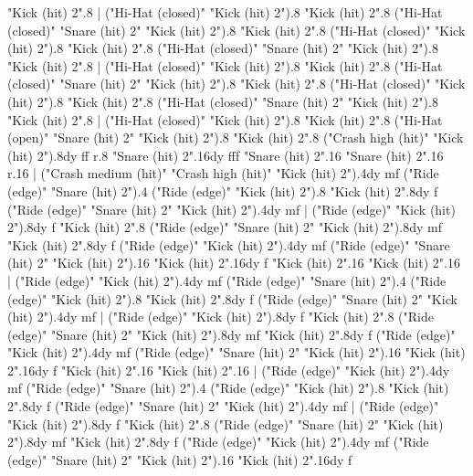       "Kick (hit) 2".8
    |
      ("Hi-Hat (closed)" "Kick (hit) 2").8
      "Kick (hit) 2".8
      ("Hi-Hat (closed)" "Snare (hit) 2" "Kick (hit) 2").8
      "Kick (hit) 2".8
      ("Hi-Hat (closed)" "Kick (hit) 2").8
      "Kick (hit) 2".8
      ("Hi-Hat (closed)" "Snare (hit) 2" "Kick (hit) 2").8
      "Kick (hit) 2".8
    |
      ("Hi-Hat (closed)" "Kick (hit) 2").8
      "Kick (hit) 2".8
      ("Hi-Hat (closed)" "Snare (hit) 2" "Kick (hit) 2").8
      "Kick (hit) 2".8
      ("Hi-Hat (closed)" "Kick (hit) 2").8
      "Kick (hit) 2".8
      ("Hi-Hat (closed)" "Snare (hit) 2" "Kick (hit) 2").8
      "Kick (hit) 2".8
    |
      ("Hi-Hat (closed)" "Kick (hit) 2").8
      "Kick (hit) 2".8
      ("Hi-Hat (open)" "Snare (hit) 2" "Kick (hit) 2").8
      "Kick (hit) 2".8
      ("Crash high (hit)" "Kick (hit) 2").8{dy ff}
      r.8
      "Snare (hit) 2".16{dy fff}
      "Snare (hit) 2".16
      "Snare (hit) 2".16
      r.16
    |
      ("Crash medium (hit)" "Crash high (hit)" "Kick (hit) 2").4{dy mf}
      ("Ride (edge)" "Snare (hit) 2").4
      ("Ride (edge)" "Kick (hit) 2").8
      "Kick (hit) 2".8{dy f}
      ("Ride (edge)" "Snare (hit) 2" "Kick (hit) 2").4{dy mf}
    |
      ("Ride (edge)" "Kick (hit) 2").8{dy f}
      "Kick (hit) 2".8
      ("Ride (edge)" "Snare (hit) 2" "Kick (hit) 2").8{dy mf}
      "Kick (hit) 2".8{dy f}
      ("Ride (edge)" "Kick (hit) 2").4{dy mf}
      ("Ride (edge)" "Snare (hit) 2" "Kick (hit) 2").16
      "Kick (hit) 2".16{dy f}
      "Kick (hit) 2".16
      "Kick (hit) 2".16
    |
      ("Ride (edge)" "Kick (hit) 2").4{dy mf}
      ("Ride (edge)" "Snare (hit) 2").4
      ("Ride (edge)" "Kick (hit) 2").8
      "Kick (hit) 2".8{dy f}
      ("Ride (edge)" "Snare (hit) 2" "Kick (hit) 2").4{dy mf}
    |
      ("Ride (edge)" "Kick (hit) 2").8{dy f}
      "Kick (hit) 2".8
      ("Ride (edge)" "Snare (hit) 2" "Kick (hit) 2").8{dy mf}
      "Kick (hit) 2".8{dy f}
      ("Ride (edge)" "Kick (hit) 2").4{dy mf}
      ("Ride (edge)" "Snare (hit) 2" "Kick (hit) 2").16
      "Kick (hit) 2".16{dy f}
      "Kick (hit) 2".16
      "Kick (hit) 2".16
    |
      ("Ride (edge)" "Kick (hit) 2").4{dy mf}
      ("Ride (edge)" "Snare (hit) 2").4
      ("Ride (edge)" "Kick (hit) 2").8
      "Kick (hit) 2".8{dy f}
      ("Ride (edge)" "Snare (hit) 2" "Kick (hit) 2").4{dy mf}
    |
      ("Ride (edge)" "Kick (hit) 2").8{dy f}
      "Kick (hit) 2".8
      ("Ride (edge)" "Snare (hit) 2" "Kick (hit) 2").8{dy mf}
      "Kick (hit) 2".8{dy f}
      ("Ride (edge)" "Kick (hit) 2").4{dy mf}
      ("Ride (edge)" "Snare (hit) 2" "Kick (hit) 2").16
      "Kick (hit) 2".16{dy f}
